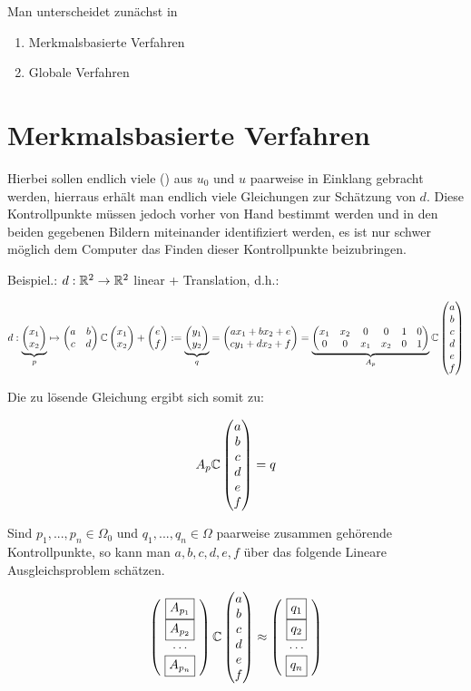 Man unterscheidet zunächst in

\begin{enumerate}
    \item[\textbullet] Merkmalsbasierte Verfahren
    \item[\textbullet] Globale Verfahren
\end{enumerate}

\section{Merkmalsbasierte Verfahren}

Hierbei sollen endlich viele () aus $u_0$ und $u$ paarweise in Einklang gebracht werden, hierraus erhält man endlich viele Gleichungen zur Schätzung von $d$. Diese Kontrollpunkte müssen jedoch vorher von Hand bestimmt werden und in den beiden gegebenen Bildern miteinander identifiziert werden, es ist nur schwer möglich dem Computer das Finden dieser Kontrollpunkte beizubringen.

Beispiel.: $d:\mathbb{R}^2 \to \mathbb{R}^2$ linear + Translation, d.h.:

\[ d:\underbrace{\begin{pmatrix} x_1 \\ x_2 \end{pmatrix}}_{p} \mapsto \begin{pmatrix} a & b \\ c & d \end{pmatrix} \mathbb{C} \begin{pmatrix} x_1 \\ x_2 \end{pmatrix}+ \begin{pmatrix} e\\f \end{pmatrix}:=\underbrace{\begin{pmatrix} y_1 \\ y_2 \end{pmatrix}}_{q} = \begin{pmatrix} ax_1 + bx_2 +e\\ cy_1 + dx_2 + f \end{pmatrix} = \underbrace{\begin{pmatrix} x_1 & x_2 & 0 & 0 & 1 & 0\\ 0 & 0 & x_1 & x_2 & 0 & 1 \end{pmatrix}}_{A_p}\mathbb{C} \begin{pmatrix} a\\b\\c\\d\\e\\f \end{pmatrix}\]

Die zu lösende Gleichung ergibt sich somit zu:

\[A_p \mathbb{C} \begin{pmatrix} a\\b\\c\\d\\e\\f \end{pmatrix} = q\]

Sind $p_1,...,p_n \in \Omega_0$ und $q_1,...,q_n \in \Omega$ paarweise zusammen gehörende Kontrollpunkte, so kann man $a,b,c,d,e,f$ über das folgende Lineare Ausgleichsproblem schätzen.

\[ \mat{\ \boxed{A_{p_1}} \ \\ \ \boxed{A_{p_2}} \ \\ \cdots \\ \ \boxed{A_{p_n}} \ } \C \mat{a\\b\\c\\d\\e\\f} \approx \mat{\ \boxed{q_1 \vphantom{A_{p_1}}} \ \\ \ \boxed{q_2 \vphantom{A_{p_1}}} \ \\ \cdots \\ \ \boxed{q_n \vphantom{A_{p_1}}} \ }\]

